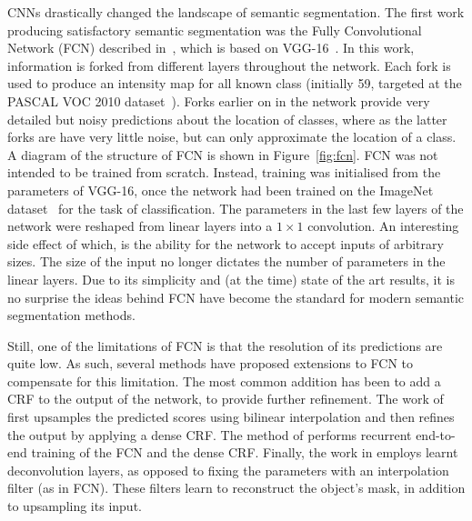 CNNs drastically changed the landscape of semantic segmentation. The
first work producing satisfactory semantic segmentation was the Fully
Convolutional Network (FCN) described in~\cite{long2015fully}, which
is based on VGG-16~\cite{simonyan2014vgg}. In this work, information
is forked from different layers throughout the network. Each fork is
used to produce an intensity map for all known class (initially 59,
targeted at the PASCAL VOC 2010
dataset~\cite{everingham2010pascal}). Forks earlier on in the network
provide very detailed but noisy predictions about the location of
classes, where as the latter forks are have very little noise, but can
only approximate the location of a class. A diagram of the structure
of FCN is shown in Figure~\ref{fig:fcn}. FCN was not intended to be
trained from scratch. Instead, training was initialised from the
parameters of VGG-16, once the network had been trained on the
ImageNet dataset~\cite{krizhevsky2012imagenet} for the task of
classification. The parameters in the last few layers of the network
were reshaped from linear layers into a $1\times 1$ convolution. An
interesting side effect of which, is the ability for the network to
accept inputs of arbitrary sizes. The size of the input no longer
dictates the number of parameters in the linear layers. Due to its
simplicity and (at the time) state of the art results, it is no
surprise the ideas behind FCN have become the standard for modern
semantic segmentation methods.

Still, one of the limitations of FCN is that the resolution of its
predictions are quite low. As such, several methods have proposed
extensions to FCN to compensate for this limitation. The most common
addition has been to add a CRF to the output of the network, to
provide further refinement. The work of \cite{chen2015semantic}
first upsamples the predicted scores using bilinear interpolation
and then refines the output by applying a dense CRF. The method of
\cite{zheng2015conditional} performs recurrent end-to-end training of
the FCN and the dense CRF. Finally, the work in \cite{noh2015learning}
employs learnt deconvolution layers, as opposed to fixing the
parameters with an interpolation filter (as in FCN). These filters
learn to reconstruct the object's mask, in addition to upsampling its
input.

